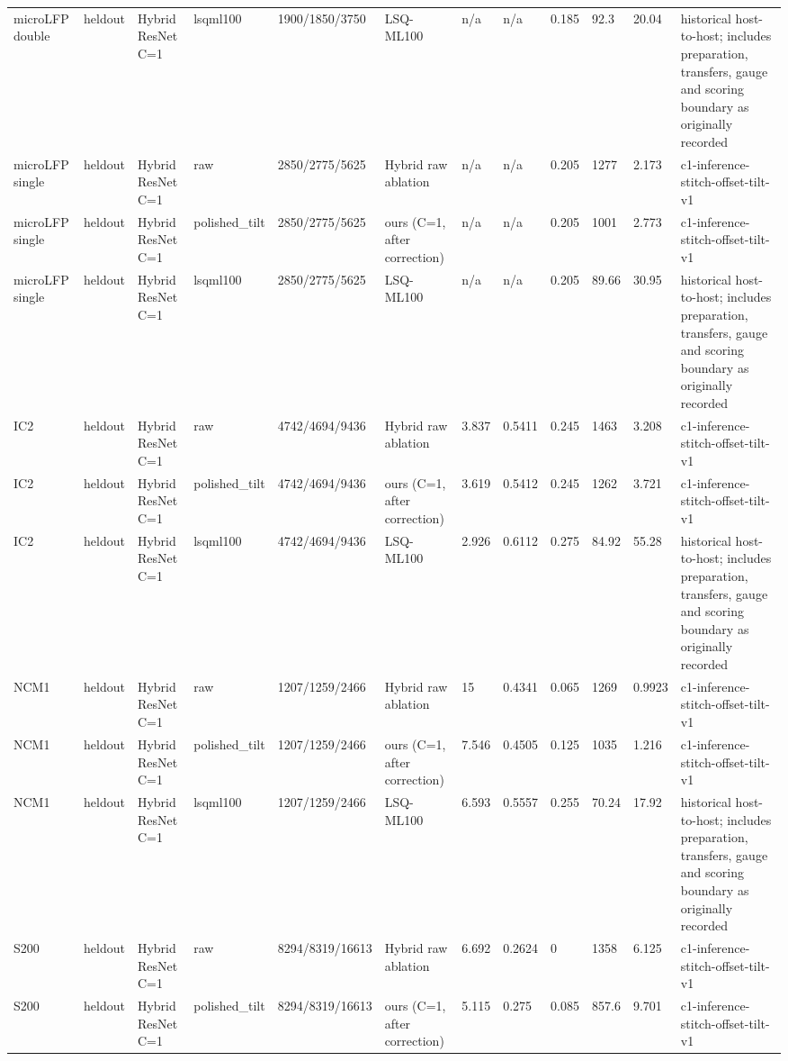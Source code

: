 \begin{tabular}{llllllllllll}
microLFP double & heldout & Hybrid ResNet C=1 & lsqml100 & 1900/1850/3750 & LSQ-ML100 & n/a & n/a & 0.185 & 92.3 & 20.04 & historical host-to-host; includes preparation, transfers, gauge and scoring boundary as originally recorded \\
microLFP single & heldout & Hybrid ResNet C=1 & raw & 2850/2775/5625 & Hybrid raw ablation & n/a & n/a & 0.205 & 1277 & 2.173 & c1-inference-stitch-offset-tilt-v1 \\
microLFP single & heldout & Hybrid ResNet C=1 & polished\_tilt & 2850/2775/5625 & ours (C=1, after correction) & n/a & n/a & 0.205 & 1001 & 2.773 & c1-inference-stitch-offset-tilt-v1 \\
microLFP single & heldout & Hybrid ResNet C=1 & lsqml100 & 2850/2775/5625 & LSQ-ML100 & n/a & n/a & 0.205 & 89.66 & 30.95 & historical host-to-host; includes preparation, transfers, gauge and scoring boundary as originally recorded \\
IC2 & heldout & Hybrid ResNet C=1 & raw & 4742/4694/9436 & Hybrid raw ablation & 3.837 & 0.5411 & 0.245 & 1463 & 3.208 & c1-inference-stitch-offset-tilt-v1 \\
IC2 & heldout & Hybrid ResNet C=1 & polished\_tilt & 4742/4694/9436 & ours (C=1, after correction) & 3.619 & 0.5412 & 0.245 & 1262 & 3.721 & c1-inference-stitch-offset-tilt-v1 \\
IC2 & heldout & Hybrid ResNet C=1 & lsqml100 & 4742/4694/9436 & LSQ-ML100 & 2.926 & 0.6112 & 0.275 & 84.92 & 55.28 & historical host-to-host; includes preparation, transfers, gauge and scoring boundary as originally recorded \\
NCM1 & heldout & Hybrid ResNet C=1 & raw & 1207/1259/2466 & Hybrid raw ablation & 15 & 0.4341 & 0.065 & 1269 & 0.9923 & c1-inference-stitch-offset-tilt-v1 \\
NCM1 & heldout & Hybrid ResNet C=1 & polished\_tilt & 1207/1259/2466 & ours (C=1, after correction) & 7.546 & 0.4505 & 0.125 & 1035 & 1.216 & c1-inference-stitch-offset-tilt-v1 \\
NCM1 & heldout & Hybrid ResNet C=1 & lsqml100 & 1207/1259/2466 & LSQ-ML100 & 6.593 & 0.5557 & 0.255 & 70.24 & 17.92 & historical host-to-host; includes preparation, transfers, gauge and scoring boundary as originally recorded \\
S200 & heldout & Hybrid ResNet C=1 & raw & 8294/8319/16613 & Hybrid raw ablation & 6.692 & 0.2624 & 0 & 1358 & 6.125 & c1-inference-stitch-offset-tilt-v1 \\
S200 & heldout & Hybrid ResNet C=1 & polished\_tilt & 8294/8319/16613 & ours (C=1, after correction) & 5.115 & 0.275 & 0.085 & 857.6 & 9.701 & c1-inference-stitch-offset-tilt-v1 \\

\end{tabular}
